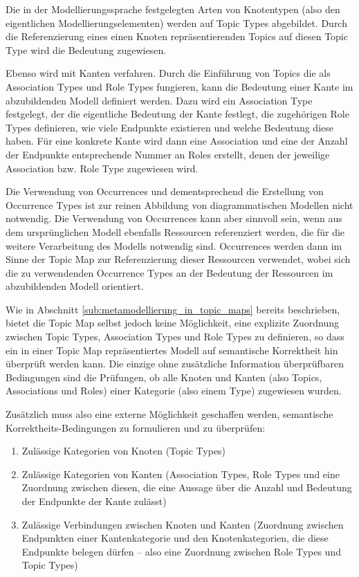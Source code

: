 Die in der Modellierungssprache festgelegten Arten von Knotentypen (also den eigentlichen Modellierungselementen) werden auf Topic Types abgebildet. Durch die Referenzierung eines einen Knoten repräsentierenden Topics auf diesen Topic Type wird die Bedeutung zugewiesen.

Ebenso wird mit Kanten verfahren. Durch die Einführung von Topics die als Association Types und Role Types fungieren, kann die Bedeutung einer Kante im abzubildenden Modell definiert werden. Dazu wird ein Association Type festgelegt, der die eigentliche Bedeutung der Kante festlegt, die zugehörigen Role Types definieren, wie viele Endpunkte existieren und welche Bedeutung diese haben. Für eine konkrete Kante wird dann eine Association und eine der Anzahl der Endpunkte entsprechende Nummer an Roles erstellt, denen der jeweilige Association bzw. Role Type zugewiesen wird. 

Die Verwendung von Occurrences und dementsprechend die Erstellung von Occurrence Types ist zur reinen Abbildung von diagrammatischen Modellen nicht notwendig. Die Verwendung von Occurrences kann aber sinnvoll sein, wenn aus dem ursprünglichen Modell ebenfalls Ressourcen referenziert werden, die für die weitere Verarbeitung des Modells notwendig sind. Occurrences werden dann im Sinne der Topic Map zur Referenzierung dieser Ressourcen verwendet, wobei sich die zu verwendenden Occurrence Types an der Bedeutung der Ressourcen im abzubildenden Modell orientiert.

Wie in Abschnitt \ref{sub:metamodellierung_in_topic_maps} bereits beschrieben, bietet die Topic Map selbst jedoch keine Möglichkeit, eine explizite Zuordnung zwischen Topic Types, Association Types und Role Types zu definieren, so dass ein in einer Topic Map repräsentiertes Modell auf semantische Korrektheit hin überprüft werden kann. Die einzige ohne zusätzliche Information überprüfbaren Bedingungen sind die Prüfungen, ob alle Knoten und Kanten (also Topics, Associations und Roles) einer Kategorie (also einem Type) zugewiesen  wurden.

Zusätzlich muss also eine externe Möglichkeit geschaffen werden, semantische Korrektheits-Bedingungen zu formulieren und zu überprüfen:
\begin{enumerate}
 \item Zulässige Kategorien von Knoten (Topic Types)
 \item Zulässige Kategorien von Kanten (Association Types, Role Types und eine Zuordnung zwischen diesen, die eine Aussage über die Anzahl und Bedeutung der Endpunkte der Kante zulässt)
 \item Zulässige Verbindungen zwischen Knoten und Kanten (Zuordnung zwischen Endpunkten einer Kantenkategorie und den Knotenkategorien, die diese Endpunkte belegen dürfen -- also eine Zuordnung zwischen Role Types und Topic Types)
\end{enumerate}

